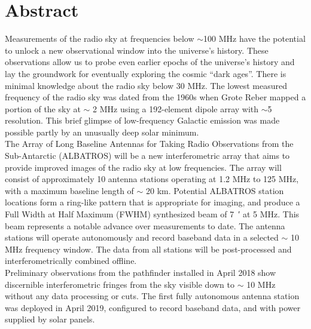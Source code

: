 \section*{Abstract}
	
Measurements of the radio sky at frequencies below $\sim$100 MHz have the potential to unlock a new observational window into the universe’s history. These observations allow us to probe even earlier epochs of the universe’s history and lay the groundwork for eventually
exploring the cosmic “dark ages”. There is minimal knowledge about the radio sky below 30 MHz. The lowest measured frequency of the radio sky was dated from the 1960s when Grote Reber mapped a portion of the sky at $ \sim $ 2 MHz using a 192-element dipole array with $\sim$5 \degree
resolution. This brief glimpse of low-frequency Galactic emission was made possible partly by an unusually deep solar minimum.\\

The Array of Long Baseline Antennas for Taking Radio Observations from the Sub-Antarctic (ALBATROS) will be a new interferometric array that aims to provide improved images of the radio sky at low frequencies. The array will consist of approximately 10 antenna stations operating at 1.2 MHz to 125 MHz, with a maximum baseline length of $\sim$ 20 km. Potential ALBATROS station locations form a ring-like pattern that is appropriate for imaging, and produce a Full Width at Half Maximum (FWHM) synthesized beam of \SI{7}{\arcminute} at 5 MHz. This
beam represents a notable advance over measurements to date. The antenna stations will operate autonomously and record baseband data in a selected $ \sim $ 10 MHz frequency window. The data from all stations will be post-processed and interferometrically combined
offline. \\

Preliminary observations from the pathfinder installed in April 2018 show discernible interferometric fringes from the sky visible down to $\sim$ 10 MHz without any data processing or cuts. The first fully autonomous antenna station was deployed in April 2019, configured to record baseband data, and with power supplied by solar panels. 


